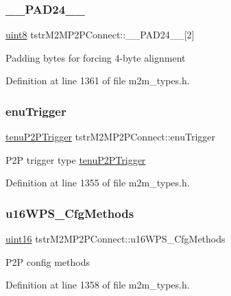 \subsubsection{\texorpdfstring{\+\_\+\+\_\+\+P\+A\+D24\+\_\+\+\_\+}{\_\_PAD24\_\_}}
{\footnotesize\ttfamily \hyperlink{group__DataT_ga4df709a77647e870bbf1d955b8edc9a6}{uint8} tstr\+M2\+M\+P2\+P\+Connect\+::\+\_\+\+\_\+\+P\+A\+D24\+\_\+\+\_\+\mbox{[}2\mbox{]}}

Padding bytes for forcing 4-\/byte alignment 

Definition at line 1361 of file m2m\+\_\+types.\+h.

\mbox{\label{structtstrM2MP2PConnect_a760354e813b16c4b71f716a365f1347e}} 
\subsubsection{\texorpdfstring{enu\+Trigger}{enuTrigger}}
{\footnotesize\ttfamily \hyperlink{group__WlanEnums_ga0b97cca65d26d6163cabcb708e5759df}{tenu\+P2\+P\+Trigger} tstr\+M2\+M\+P2\+P\+Connect\+::enu\+Trigger}

P2P trigger type \hyperlink{group__WlanEnums_ga0b97cca65d26d6163cabcb708e5759df}{tenu\+P2\+P\+Trigger} 

Definition at line 1355 of file m2m\+\_\+types.\+h.

\mbox{\label{structtstrM2MP2PConnect_aa4e2e9393359cd24e0c75136a0515f75}} 
\subsubsection{\texorpdfstring{u16\+W\+P\+S\+\_\+\+Cfg\+Methods}{u16WPS\_CfgMethods}}
{\footnotesize\ttfamily \hyperlink{group__DataT_ga1daa745171fc6e31d942c161422a76f9}{uint16} tstr\+M2\+M\+P2\+P\+Connect\+::u16\+W\+P\+S\+\_\+\+Cfg\+Methods}

P2P config methods 

Definition at line 1358 of file m2m\+\_\+types.\+h.

